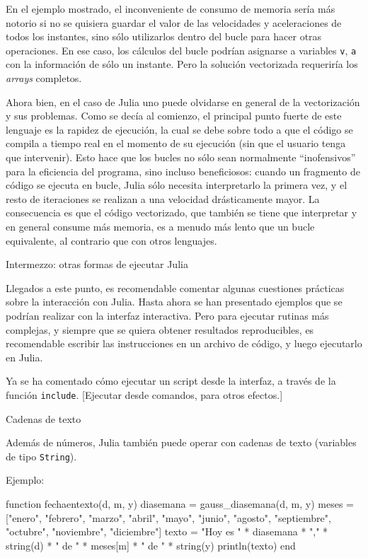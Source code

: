 ﻿\documentclass[spanish]{article}
\begin{document}
{{En el ejemplo mostrado, el inconveniente de consumo de memoria sería
más notorio si no se quisiera guardar el valor de las velocidades y
aceleraciones de todos los instantes, sino sólo utilizarlos dentro
del bucle para hacer otras operaciones. En ese caso, los cálculos del bucle
podrían asignarse a variables \texttt{v}, \texttt{a} con la información de sólo
un instante. Pero la solución vectorizada requeriría los \emph{arrays}
completos.

Ahora bien, en el caso de Julia uno puede olvidarse en general
de la vectorización y sus problemas. Como se decía al comienzo, el principal punto
fuerte de este lenguaje es la rapidez de ejecución, la cual se debe
sobre todo a que el código se compila a tiempo real en el momento de
su ejecución (sin que el usuario tenga que intervenir). Esto hace
que los bucles no sólo sean normalmente ``inofensivos'' para la
eficiencia del programa, sino incluso beneficiosos: cuando un
fragmento de código se ejecuta en bucle, Julia sólo necesita
interpretarlo la primera vez, y el resto de iteraciones se realizan
a una velocidad drásticamente mayor. La consecuencia es que
el código vectorizado, que también se tiene que interpretar y
en general consume más memoria, es a menudo más lento que un bucle
equivalente, al contrario que con otros lenguajes.


Intermezzo: otras formas de ejecutar Julia

Llegados a este punto, es recomendable comentar algunas cuestiones prácticas
sobre la interacción con Julia. Hasta ahora se han presentado ejemplos
que se podrían realizar con la interfaz interactiva. Pero para ejecutar
rutinas más complejas, y siempre que
se quiera obtener resultados reproducibles, es recomendable escribir
las instrucciones en un archivo de código, y luego ejecutarlo en Julia.

Ya se ha comentado cómo ejecutar un script desde la interfaz, a través de
la función \texttt{include}. [Ejecutar desde comandos, para otros efectos.]


Cadenas de texto


Además de números, Julia también puede operar con cadenas de texto
(variables de tipo \texttt{String}). 

Ejemplo:

function fechaentexto(d, m, y)
  diasemana = gauss_diasemana(d, m, y)
  meses = ["enero", "febrero", "marzo", "abril", "mayo", "junio",
    "agosto", "septiembre", "octubre", "noviembre", "diciembre"]
  texto = "Hoy es " * diasemana * "," * 
    string(d) * " de " * meses[m] * " de " * string(y)
  println(texto)
end

}}
\end{document}
